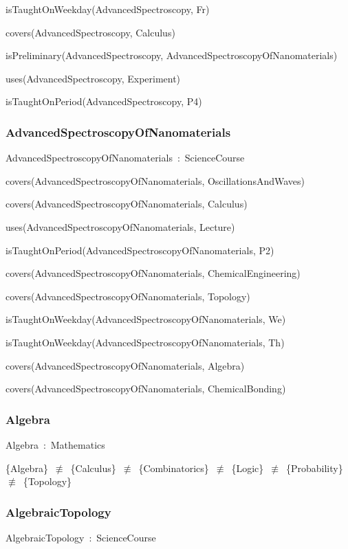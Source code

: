 \documentclass{article}
\begin{document}
isTaughtOnWeekday(AdvancedSpectroscopy, Fr)

covers(AdvancedSpectroscopy, Calculus)

isPreliminary(AdvancedSpectroscopy, AdvancedSpectroscopyOfNanomaterials)

uses(AdvancedSpectroscopy, Experiment)

isTaughtOnPeriod(AdvancedSpectroscopy, P4)

\subsubsection*{AdvancedSpectroscopyOfNanomaterials}

AdvancedSpectroscopyOfNanomaterials~:~ScienceCourse

covers(AdvancedSpectroscopyOfNanomaterials, OscillationsAndWaves)

covers(AdvancedSpectroscopyOfNanomaterials, Calculus)

uses(AdvancedSpectroscopyOfNanomaterials, Lecture)

isTaughtOnPeriod(AdvancedSpectroscopyOfNanomaterials, P2)

covers(AdvancedSpectroscopyOfNanomaterials, ChemicalEngineering)

covers(AdvancedSpectroscopyOfNanomaterials, Topology)

isTaughtOnWeekday(AdvancedSpectroscopyOfNanomaterials, We)

isTaughtOnWeekday(AdvancedSpectroscopyOfNanomaterials, Th)

covers(AdvancedSpectroscopyOfNanomaterials, Algebra)

covers(AdvancedSpectroscopyOfNanomaterials, ChemicalBonding)

\subsubsection*{Algebra}

Algebra~:~Mathematics

\{Algebra\}~\ensuremath{\not\equiv}~\{Calculus\}~\ensuremath{\not\equiv}~\{Combinatorics\}~\ensuremath{\not\equiv}~\{Logic\}~\ensuremath{\not\equiv}~\{Probability\}~\ensuremath{\not\equiv}~\{Topology\}

\subsubsection*{AlgebraicTopology}

AlgebraicTopology~:~ScienceCourse
\end{document}
